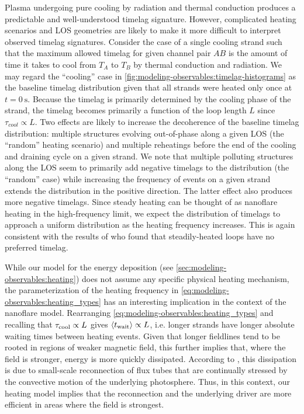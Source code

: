 Plasma undergoing pure cooling by radiation and thermal conduction produces a predictable and well-understood timelag signature. However, complicated heating scenarios and LOS geometries are likely to make it more difficult to interpret observed timelag signatures. Consider the case of a single cooling strand such that the maximum allowed timelag for given channel pair $AB$ is the amount of time it takes to cool from $T_A$ to $T_B$ by thermal conduction and radiation. We may regard the ``cooling'' case in \autoref{fig:modeling-observables:timelag-histograms} as the baseline timelag distribution given that all strands were heated only once at $t=\SI{0}{\second}$. Because the timelag is primarily determined by the cooling phase of the strand, the timelag becomes primarily a function of the loop length $L$ since $\tau_{cool}\propto L$. Two effects are likely to increase the decoherence of the baseline timelag distribution: multiple structures evolving out-of-phase along a given LOS (the ``random'' heating scenario) and multiple reheatings before the end of the cooling and draining cycle on a given strand. We note that multiple polluting structures along the LOS seem to primarily add negative timelags to the distribution (the ``random'' case) while increasing the frequency of events on a given strand extends the distribution in the positive direction. The latter effect also produces more negative timelags. Since steady heating can be thought of as nanoflare heating in the high-frequency limit, we expect the distribution of timelags to approach a uniform distribution as the heating frequency increases. This is again consistent with the results of \citet{viall_signatures_2016} who found that steadily-heated loops have no preferred timelag.

While our model for the energy deposition (see \autoref{sec:modeling-observables:heating}) does not assume any specific physical heating mechanism, the parameterization of the heating frequency in \autoref{eq:modeling-observables:heating_types} has an interesting implication in the context of the \citet{parker_nanoflares_1988} nanoflare model. Rearranging \autoref{eq:modeling-observables:heating_types} and recalling that $\tau_\textup{cool}\propto L$ gives $\langle t_{\textup{wait}}\rangle\propto L$, i.e. longer strands have longer absolute waiting times between heating events. Given that longer fieldlines tend to be rooted in regions of weaker magnetic field, this further implies that, where the field is stronger, energy is more quickly dissipated. According to \citet{parker_nanoflares_1988}, this dissipation is due to small-scale reconnection of flux tubes that are continually stressed by the convective motion of the underlying photosphere. Thus, in this context, our heating model implies that the reconnection and the underlying driver are more efficient in areas where the field is strongest.

